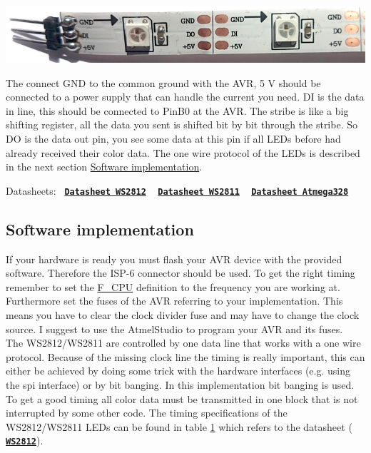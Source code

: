 \begin{DoxyImage}
\includegraphics[width=\textwidth,height=\textheight/2,keepaspectratio=true]{WS2812.png}
\caption{W\+S2812 stribe with pin header}
\end{DoxyImage}
  The connect G\+N\+D to the common ground with the A\+V\+R, 5 V should be connected to a power supply that can handle the current you need. D\+I is the data in line, this should be connected to Pin\+B0 at the A\+V\+R. The stribe is like a big shifting register, all the data you sent is shifted bit by bit through the stribe. So D\+O is the data out pin, you see some data at this pin if all L\+E\+Ds before had already received their color data. The one wire protocol of the L\+E\+Ds is described in the next section \hyperlink{index_software_sec}{Software implementation}.

Datasheets\+:~\newline
 \href{WS2812.pdf}{\tt {\bfseries Datasheet W\+S2812}} ~\newline
 \href{WS2811.pdf}{\tt {\bfseries Datasheet W\+S2811}} ~\newline
 \href{Atmega328.pdf}{\tt {\bfseries Datasheet Atmega328}} ~\newline
\hypertarget{index_software_sec}{}\subsection{Software implementation}\label{index_software_sec}
If your hardware is ready you must flash your A\+V\+R device with the provided software. Therefore the I\+S\+P-\/6 connector should be used. To get the right timing remember to set the \hyperlink{globals_8h_a43bafb28b29491ec7f871319b5a3b2f8}{F\+\_\+\+C\+P\+U} definition to the frequency you are working at. Furthermore set the fuses of the A\+V\+R referring to your implementation. This means you have to clear the clock divider fuse and may have to change the clock source. I suggest to use the Atmel\+Studio to program your A\+V\+R and its fuses. ~\newline
 The W\+S2812/\+W\+S2811 are controlled by one data line that works with a one wire protocol. Because of the missing clock line the timing is really important, this can either be achieved by doing some trick with the hardware interfaces (e.\+g. using the spi interface) or by bit banging. In this implementation bit banging is used. To get a good timing all color data must be transmitted in one block that is not interrupted by some other code. The timing specifications of the W\+S2812/\+W\+S2811 L\+E\+Ds can be found in table \hyperlink{index_timingtable}{1} which refers to the datasheet ( \href{WS2812.pdf}{\tt {\bfseries W\+S2812}}).~\newline


